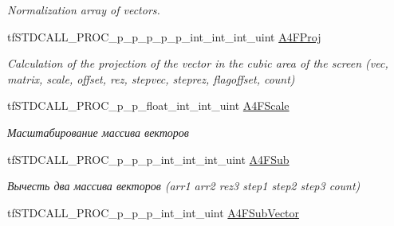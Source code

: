 \begin{DoxyCompactItemize}
\begin{DoxyCompactList}\small\item\em Normalization array of vectors. \end{DoxyCompactList}\item 
\hypertarget{structs_functions_array_vector_c_p_u_a14e63a193b8567b5a08344eb9e951c4b}{tf\-S\-T\-D\-C\-A\-L\-L\-\_\-\-P\-R\-O\-C\-\_\-p\-\_\-p\-\_\-p\-\_\-p\-\_\-p\-\_\-int\-\_\-int\-\_\-int\-\_\-uint \hyperlink{structs_functions_array_vector_c_p_u_a14e63a193b8567b5a08344eb9e951c4b}{A4\-F\-Proj}}\label{structs_functions_array_vector_c_p_u_a14e63a193b8567b5a08344eb9e951c4b}

\begin{DoxyCompactList}\small\item\em Calculation of the projection of the vector in the cubic area of the screen (vec, matrix, scale, offset, rez, stepvec, steprez, flagoffset, count) \end{DoxyCompactList}\item 
\hypertarget{structs_functions_array_vector_c_p_u_abdf53358636e30904334204ad5f07468}{tf\-S\-T\-D\-C\-A\-L\-L\-\_\-\-P\-R\-O\-C\-\_\-p\-\_\-p\-\_\-float\-\_\-int\-\_\-int\-\_\-uint \hyperlink{structs_functions_array_vector_c_p_u_abdf53358636e30904334204ad5f07468}{A4\-F\-Scale}}\label{structs_functions_array_vector_c_p_u_abdf53358636e30904334204ad5f07468}

\begin{DoxyCompactList}\small\item\em Масштабирование массива векторов \end{DoxyCompactList}\item 
\hypertarget{structs_functions_array_vector_c_p_u_a086e4d104034f0b79ed14a34cb45ac82}{tf\-S\-T\-D\-C\-A\-L\-L\-\_\-\-P\-R\-O\-C\-\_\-p\-\_\-p\-\_\-p\-\_\-int\-\_\-int\-\_\-int\-\_\-uint \hyperlink{structs_functions_array_vector_c_p_u_a086e4d104034f0b79ed14a34cb45ac82}{A4\-F\-Sub}}\label{structs_functions_array_vector_c_p_u_a086e4d104034f0b79ed14a34cb45ac82}

\begin{DoxyCompactList}\small\item\em Вычесть два массива векторов (arr1 arr2 rez3 step1 step2 step3 count) \end{DoxyCompactList}\item 
\hypertarget{structs_functions_array_vector_c_p_u_affb24479addde1b43edaaf256c9c5e91}{tf\-S\-T\-D\-C\-A\-L\-L\-\_\-\-P\-R\-O\-C\-\_\-p\-\_\-p\-\_\-p\-\_\-int\-\_\-int\-\_\-uint \hyperlink{structs_functions_array_vector_c_p_u_affb24479addde1b43edaaf256c9c5e91}{A4\-F\-Sub\-Vector}}\label{structs_functions_array_vector_c_p_u_affb24479addde1b43edaaf256c9c5e91}


\end{DoxyCompactItemize}
